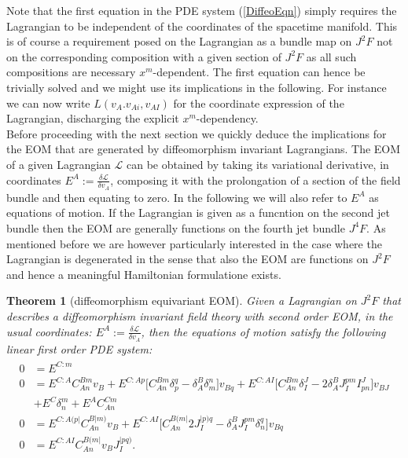 \documentclass[a4paper,12pt, DIV=14, BCOR=5mm, twoside, headsepline]{scrbook}
\newtheorem{theorem}{Theorem}[section]
\begin{document}
Note that the first equation in the PDE system (\ref{DiffeoEqn}) simply requires the Lagrangian to be independent of the coordinates of the spacetime manifold. This is of course a requirement posed on the Lagrangian as a bundle map on $J^2F$ not on the corresponding composition with a given section of $J^2F$ as all such compositions are necessary $x^m$-dependent. The first equation can hence be trivially solved and we might use its implications in the following. For instance we can now write $L(v_A.v_{Ai},v_{AI})$ for the coordinate expression of the Lagrangian, discharging the explicit $x^m$-dependency.\\

Before proceeding with the next section we quickly deduce the implications for the EOM that are generated by diffeomorphism invariant Lagrangians. The EOM of a given Lagrangian $\mathcal{L}$ can be obtained by taking its variational derivative, in coordinates $E^A := \frac{\delta \mathcal{L}}{\delta v_A}$, composing it with the prolongation of a section of the field bundle and then equating to zero. In the following we will also refer to $E^A$ as equations of motion. If the Lagrangian is given as a funcntion on the second jet bundle then the EOM are generally functions on the fourth jet bundle $J^4F$. As mentioned before we are however particularly interested in the case where the Lagrangian is degenerated in the sense that also the EOM are functions on $J^2F$ and hence a meaningful Hamiltonian formulatione exists.
\begin{theorem}[diffeomorphism equivariant EOM]
Given a Lagrangian on $J^2F$ that describes a diffeomorphism invariant field theory with second order EOM, in the usual coordinates: $E^A := \frac{\delta \mathcal{L}}{\delta v_A}$, then the equations of motion satisfy the following linear first order PDE system:
\begin{align}\label{EOM}
    \begin{aligned}
    0 &= E^{C:m} \\
    0 &= E^{C:A} C_{An}^{Bm} v_B + E^{C:Ap} \bigl[ C_{An}^{Bm} \delta_p^q - \delta_A^B \delta_m^n \bigr] v_{Bq} + E^{C:AI} \bigl[ C_{An}^{Bm} \delta_I^J - 2 \delta_A^B J_I^{pm} I^J_{pn}  \bigr] v_{BJ}\\
    &+ E^C \delta^m_n + E^A C_{An}^{Cm}  \\
    0 &= E^{C:A(p\vert}C_{An}^{B \vert m)} v_B + E^{C: AI} \bigl[ C_{An}^{B(m\vert} 2 J_I^{\vert p) q} - \delta^B_A J_I ^{pm} \delta_n^q \bigr] v_{Bq} \\
    0 &= E^{C:AI} C_{An}^{B(m\vert} v_B J_I^{\vert p q )}.
    \end{aligned}
\end{align}
\end{theorem}
\end{document}
